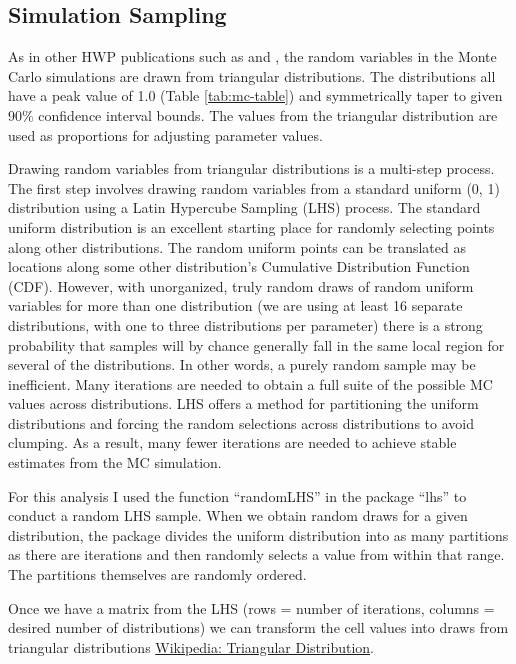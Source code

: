\documentclass[
  openany]{book}
\begin{document}
\hypertarget{model-mc-samp}{%
\subsection{Simulation Sampling}\label{model-mc-samp}}

As in other HWP publications such as \textcite{stockmann2012} and \textcite{anderson2013}, the random variables in the Monte Carlo simulations are drawn from triangular distributions. The distributions all have a peak value of 1.0 (Table \ref{tab:mc-table}) and symmetrically taper to given 90\% confidence interval bounds. The values from the triangular distribution are used as proportions for adjusting parameter values.

Drawing random variables from triangular distributions is a multi-step process. The first step involves drawing random variables from a standard uniform (0, 1) distribution using a Latin Hypercube Sampling (LHS) process. The standard uniform distribution is an excellent starting place for randomly selecting points along other distributions. The random uniform points can be translated as locations along some other distribution's Cumulative Distribution Function (CDF). However, with unorganized, truly random draws of random uniform variables for more than one distribution (we are using at least 16 separate distributions, with one to three distributions per parameter) there is a strong probability that samples will by chance generally fall in the same local region for several of the distributions. In other words, a purely random sample may be inefficient. Many iterations are needed to obtain a full suite of the possible MC values across distributions. LHS offers a method for partitioning the uniform distributions and forcing the random selections across distributions to avoid clumping. As a result, many fewer iterations are needed to achieve stable estimates from the MC simulation.

For this analysis I used the function ``randomLHS'' in the package ``lhs'' \autocite{R-lhs} to conduct a random LHS sample. When we obtain random draws for a given distribution, the package divides the uniform distribution into as many partitions as there are iterations and then randomly selects a value from within that range. The partitions themselves are randomly ordered.

Once we have a matrix from the LHS (rows = number of iterations, columns = desired number of distributions) we can transform the cell values into draws from triangular distributions \href{https://en.wikipedia.org/wiki/Triangular_distribution}{Wikipedia: Triangular Distribution}.
\end{document}
